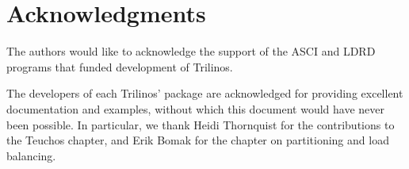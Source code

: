 \documentclass[12pt,relax]{SANDreport}
\begin{document}
\clearpage
\section*{Acknowledgments}
The authors would like to acknowledge the support of the ASCI and LDRD programs
that funded development of Trilinos.

\medskip

The developers of each Trilinos' package are acknowledged for providing
excellent documentation and examples, without which this document would
have never been possible. In particular, we thank Heidi Thornquist for
the contributions to the Teuchos chapter, and Erik Bomak for the chapter
on partitioning and load balancing.

\clearpage

\SANDmain

\tableofcontents

\clearpage



%

\clearpage
\newpage


\clearpage
\newpage


\clearpage
\newpage


\clearpage
\newpage


\clearpage
\newpage


\clearpage
\newpage


\clearpage
\newpage


\clearpage
\newpage


\clearpage
\newpage


%

\clearpage
\newpage


\clearpage
\newpage




\end{document}
